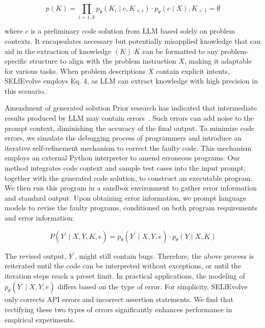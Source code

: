 \documentclass[a4paper,oneside]{book}
\begin{document}
\begin{equation}
    p(K)=\prod_{i=1 . . k} p_{\theta}\left(K_{i} \mid c, K_{<i}\right) \cdot p_{\theta}(c \mid X), K_{<1}=\emptyset
\end{equation}

where $c$ is a preliminary code solution from LLM based solely on problem contexts. It encapsulates necessary but potentially misapplied knowledge that can aid in the extraction of knowledge $(K) . K$ can be formatted to any problem-specific structure to align with the problem instruction $X$, making it adaptable for various tasks. When problem descriptions $X$ contain explicit intents, SELfEvolve employs Eq. 4, as LLM can extract knowledge with high precision in this scenario.

Amendment of generated solution Prior research has indicated that intermediate results produced by LLM may contain errors~\cite{lyu2023faithful, wang2022self, wei2022chain, zhang2022automatic}. Such errors can add noise to the prompt context, diminishing the accuracy of the final output. To minimize code errors, we simulate the debugging process of programmers and introduce an iterative self-refinement mechanism to correct the faulty code. This mechanism employs an external Python interpreter to amend erroneous programs. Our method integrates code context and sample test cases into the input prompt, together with the generated code solution, to construct an executable program. We then run this program in a sandbox environment to gather error information and standard output. Upon obtaining error information, we prompt language models to revise the faulty programs, conditioned on both program requirements and error information:

\begin{equation}
    P\left(Y^{\prime} \mid X, Y, K, e\right)=p_{\theta}\left(Y^{\prime} \mid X, Y, e\right) \cdot p_{\theta}(Y \mid X, K)
\end{equation}

The revised output, $Y^{\prime}$, might still contain bugs. Therefore, the above process is reiterated until the code can be interpreted without exceptions, or until the iteration steps reach a preset limit. In practical applications, the modeling of $p_{\theta}\left(Y^{\prime} \mid X, Y, e\right)$ differs based on the type of error. For simplicity, SELfEvolve only corrects API errors and incorrect assertion statements. We find that rectifying these two types of errors significantly enhances performance in empirical experiments.
\end{document}
